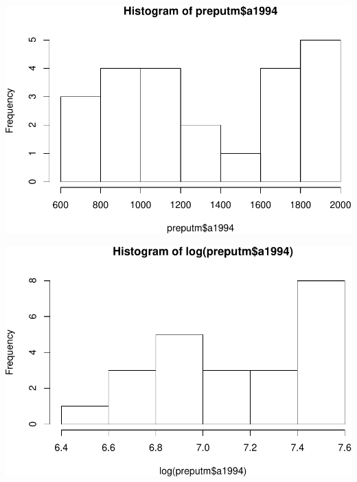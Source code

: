 \documentclass[11pt,]{article}
\newenvironment{Shaded}{\begin{snugshade}}{\end{snugshade}}
\newcommand{\KeywordTok}[1]{\textcolor[rgb]{0.13,0.29,0.53}{\textbf{#1}}}
\newcommand{\OperatorTok}[1]{\textcolor[rgb]{0.81,0.36,0.00}{\textbf{#1}}}
\newcommand{\NormalTok}[1]{#1}
\begin{document}
\includegraphics{proyecto_files/figure-latex/unnamed-chunk-4-2.pdf}

\begin{Shaded}
\end{Shaded}

\includegraphics{proyecto_files/figure-latex/unnamed-chunk-4-3.pdf}

\begin{Shaded}
\end{Shaded}
\end{document}
